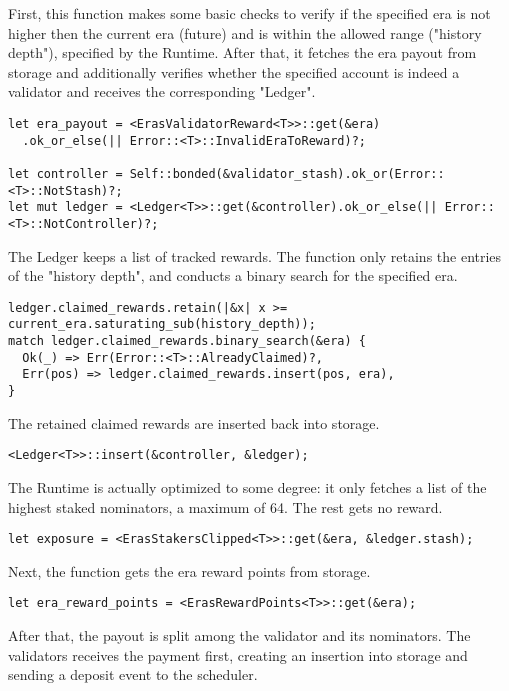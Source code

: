 \documentclass[11pt,a4paper]{article}
\begin{document}
First, this function makes some basic checks to verify if the specified era is
not higher then the current era (future) and is within the allowed range
("history depth"), specified by the Runtime. After that, it fetches the era
payout from storage and additionally verifies whether the specified account is
indeed a validator and receives the corresponding "Ledger".

\begin{verbatim}
let era_payout = <ErasValidatorReward<T>>::get(&era)
  .ok_or_else(|| Error::<T>::InvalidEraToReward)?;

let controller = Self::bonded(&validator_stash).ok_or(Error::<T>::NotStash)?;
let mut ledger = <Ledger<T>>::get(&controller).ok_or_else(|| Error::<T>::NotController)?;
\end{verbatim}

The Ledger keeps a list of tracked rewards. The function only retains the
entries of the "history depth", and conducts a binary search for the specified
era.

\begin{verbatim}
ledger.claimed_rewards.retain(|&x| x >= current_era.saturating_sub(history_depth));
match ledger.claimed_rewards.binary_search(&era) {
  Ok(_) => Err(Error::<T>::AlreadyClaimed)?,
  Err(pos) => ledger.claimed_rewards.insert(pos, era),
}
\end{verbatim}

The retained claimed rewards are inserted back into storage.

\begin{verbatim}
<Ledger<T>>::insert(&controller, &ledger);
\end{verbatim}

The Runtime is actually optimized to some degree: it only fetches a list of the
highest staked nominators, a maximum of 64. The rest gets no reward.

\begin{verbatim}
let exposure = <ErasStakersClipped<T>>::get(&era, &ledger.stash);
\end{verbatim}

Next, the function gets the era reward points from storage.

\begin{verbatim}
let era_reward_points = <ErasRewardPoints<T>>::get(&era);
\end{verbatim}

After that, the payout is split among the validator and its nominators. The
validators receives the payment first, creating an insertion into storage and
sending a deposit event to the scheduler.
\end{document}
